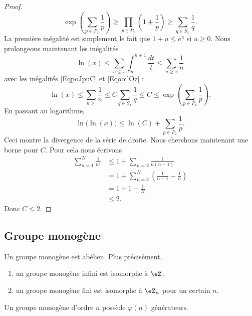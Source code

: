 \begin{proof}
\begin{equation}
        \exp\left( \sum_{p\in P_x}\frac{1}{ p } \right)\geq\prod_{p\in P_x}\left( 1+\frac{1}{ p } \right)\geq \sum_{q\in S_x}\frac{1}{ q }.
    \end{equation}
    La première inégalité est simplement le fait que \( 1+u\leq e^u\) si \( u\geq 0\). Nous prolongeons maintenant les inégalités
    \begin{equation}
        \ln(x)\leq \sum_{n\leq x}\int_{n}^{n+1}\frac{dt}{ t }\leq \sum_{n\geq x}\frac{1}{ n }
    \end{equation}
    avec les inégalités \eqref{EqpoJpuC} et \eqref{EqooilOz} :
    \begin{equation}
        \ln(x)\leq \sum_{n\geq}\frac{1}{ n }\leq C\sum_{q\in S_x}\frac{1}{ q }\leq C\leq \exp\left( \sum_{p\in P_x}\frac{1}{ p } \right).
    \end{equation}
    En passant au logarithme,
    \begin{equation}
        \ln\big( \ln(x) \big)\leq\ln(C)+\sum_{p\in P_x}\frac{1}{ p }.
    \end{equation}
    Ceci montre la divergence de la série de droite. Nous cherchons maintenant une borne pour \( C\). Pour cela nous écrivons
    \begin{subequations}
        \begin{align}
            \sum_{n=1}^N\frac{1}{ n^2 }&\leq 1+\sum_{n=2}\frac{1}{ n(n-1) }\\
            &=1+\sum_{n=2}^N\left( \frac{1}{ n-1 }-\frac{1}{ n } \right)\\
            &=1+1-\frac{1}{ N }\\
            &\leq 2.
        \end{align}
    \end{subequations}
    Donc \( C\leq 2\).
\end{proof}

\subsection{Groupe monogène}

\begin{theorem}
    Un groupe monogène est abélien. Plus précisément,
    \begin{enumerate}
        \item
            un groupe monogène infini est isomorphe à \( \eZ\),
        \item
            un groupe monogène fini est isomorphe à \( \eZ_n\) pour un certain \( n\).
    \end{enumerate}
    Un groupe monogène d'ordre \( n\) possède \( \varphi(n)\) générateurs.
\end{theorem}


